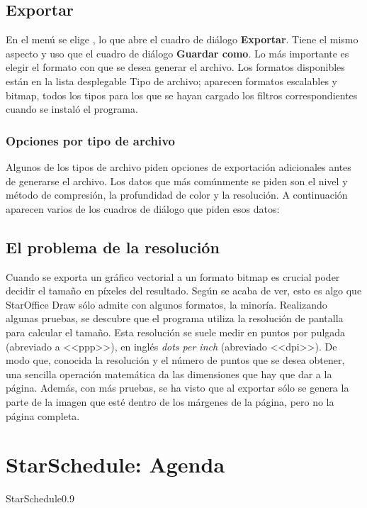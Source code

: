 \subsection{Exportar}

En el menú  se elige , lo que abre el
cuadro de diálogo \textbf{Exportar}. Tiene el mismo aspecto y uso que
el cuadro de diálogo \textbf{Guardar como}. Lo más importante es
elegir el formato con que se desea generar el archivo. Los formatos
disponibles están en la lista desplegable Tipo de archivo; aparecen
formatos escalables y bitmap, todos los tipos para los que se hayan
cargado los filtros correspondientes cuando se instaló el programa.

\subsubsection{Opciones por tipo de archivo}

Algunos de los tipos de archivo piden opciones de exportación
adicionales antes de generarse el archivo. Los datos que más
comúnmente se piden son el nivel y método de compresión, la
profundidad de color y la resolución. A continuación aparecen varios
de los cuadros de diálogo que piden esos datos:

\subsection{El problema de la resolución}

Cuando se exporta un gráfico vectorial a un formato bitmap es crucial
poder decidir el tamaño en píxeles del resultado. Según se acaba de
ver, esto es algo que StarOffice Draw sólo admite con algunos
formatos, la minoría. Realizando algunas pruebas, se descubre que el
programa utiliza la resolución de pantalla para calcular el
tamaño. Esta resolución se suele medir en puntos por pulgada
(abreviado a <<ppp>>), en inglés \emph{dots per inch} (abreviado
<<dpi>>). De modo que, conocida la resolución y el número de puntos que
se desea obtener, una sencilla operación matemática da las dimensiones
que hay que dar a la página. Además, con más pruebas, se ha visto que
al exportar sólo se genera la parte de la imagen que esté dentro de
los márgenes de la página, pero no la página completa.
\section{StarSchedule: Agenda}
\begin{figura}{StarSchedule}{0.9}
\caption{Organizar las tareas con StarSchedule}
\end{figura}

